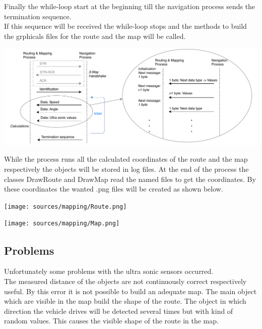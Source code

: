 Finally the while-loop start at the beginning till the navigation process sends the termination sequence.\\
If this sequence will be received the while-loop stops and the methods to build the grphicals files for the route and the map will be called.

\begin{center}
	\includegraphics[scale=0.7]{sources/mapping/communication.pdf}
\end{center}


While the process runs all the calculated coordinates of the route and the map respectively the objects will be stored in log files. At the end of the process the classes DrawRoute and DrawMap read the named files to get the coordinates. By these coordinates the wanted .png files will be created as shown below.

\begin{minipage}{0.5\textwidth}
\begin{center}
	\texttt{[image: sources/mapping/Route.png]}
\end{center}
\end{minipage}
\begin{minipage}{0.5\textwidth}
\begin{center}
	\texttt{[image: sources/mapping/Map.png]}
\end{center}
\end{minipage}


\subsection{Problems}

Unfortunately some problems with the ultra sonic sensors occurred.\\
The measured distance of the objects are not continuously correct respectively useful. By this error it is not possible to build an adequate map. The main object which are visible in the map build the shape of the route. The object in which direction the vehicle drives will be detected several times but with kind of random values. This causes the visible shape of the route in the map.